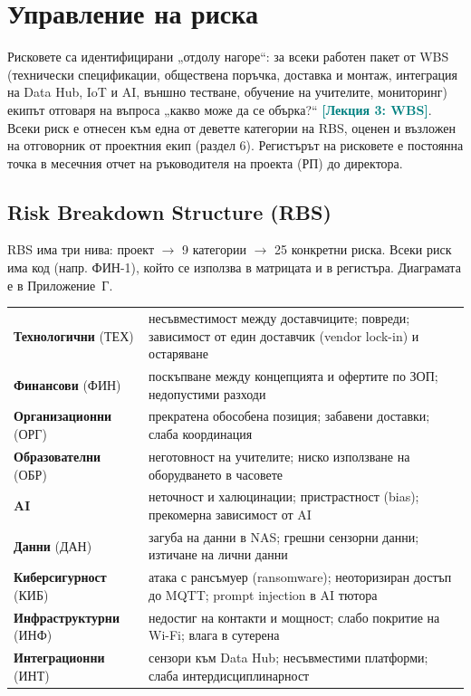 \documentclass[11pt,a4paper]{article}
\renewcommand{\arraystretch}{1.15}
\newcommand{\lecturetag}[1]{\textcolor{teal}{\small\bfseries[#1]}}
\begin{document}
\clearpage%
\section{Управление на риска}

Рисковете са идентифицирани „отдолу нагоре“: за всеки работен пакет от WBS (технически спецификации, обществена поръчка, доставка и монтаж, интеграция на Data Hub, IoT и AI, външно тестване, обучение на учителите, мониторинг) екипът отговаря на въпроса „какво може да се обърка?“ \lecturetag{Лекция 3: WBS}. Всеки риск е отнесен към една от деветте категории на RBS, оценен и възложен на отговорник от проектния екип (раздел 6). Регистърът на рисковете е постоянна точка в месечния отчет на ръководителя на проекта (РП) до директора.

\subsection{Risk Breakdown Structure (RBS)}

RBS има три нива: проект $\to$ 9 категории $\to$ 25 конкретни риска. Всеки риск има код (напр. ФИН-1), който се използва в матрицата и в регистъра. Диаграмата е в Приложение~Г.

\begingroup\footnotesize
\setlength{\tabcolsep}{4pt}
\renewcommand{\arraystretch}{1.12}
\noindent\begin{tabularx}{\textwidth}{@{}>{\raggedright\arraybackslash}p{3.95cm}>{\raggedright\arraybackslash}X@{}}
\toprule
\textbf{Технологични} (ТЕХ) & несъвместимост между доставчиците; повреди; зависимост от един доставчик (vendor lock-in) и остаряване\\
\textbf{Финансови} (ФИН) & поскъпване между концепцията и офертите по ЗОП; недопустими разходи\\
\textbf{Организационни} (ОРГ) & прекратена обособена позиция; забавени доставки; слаба координация\\
\textbf{Образователни} (ОБР) & неготовност на учителите; ниско използване на оборудването в часовете\\
\textbf{AI} & неточност и халюцинации; пристрастност (bias); прекомерна зависимост от AI\\
\textbf{Данни} (ДАН) & загуба на данни в NAS; грешни сензорни данни; изтичане на лични данни\\
\textbf{Киберсигурност} (КИБ) & атака с рансъмуер (ransomware); неоторизиран достъп до MQTT; prompt injection в AI тютора\\
\textbf{Инфраструктурни} (ИНФ) & недостиг на контакти и мощност; слабо покритие на Wi-Fi; влага в сутерена\\
\textbf{Интеграционни} (ИНТ) & сензори към Data Hub; несъвместими платформи; слаба интердисциплинарност\\
\bottomrule
\end{tabularx}
\endgroup
\end{document}
